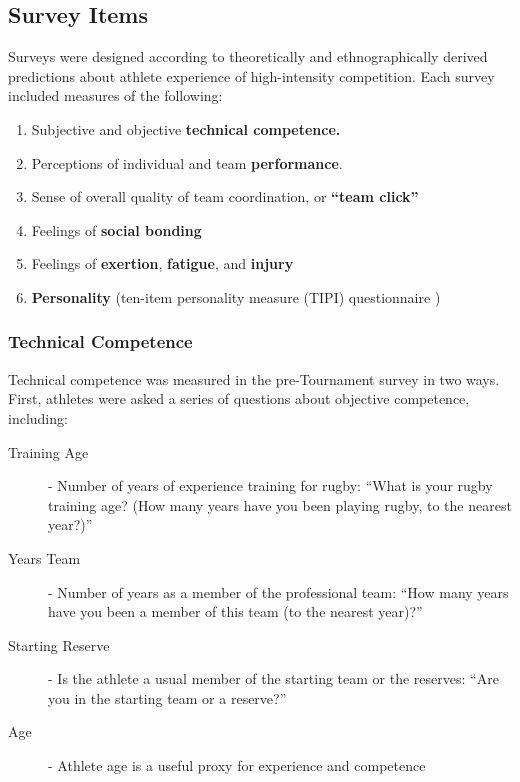 \subsection{Survey Items}

Surveys were designed according to theoretically and ethnographically derived predictions about athlete experience of high-intensity competition. Each survey included measures of the following:

\begin{enumerate}
\item Subjective and objective \textbf{technical competence.}
\item Perceptions of individual and team \textbf{performance}.
\item Sense of overall quality of team coordination, or \textbf{``team click''}
\item Feelings of \textbf{social bonding}
\item Feelings of \textbf{exertion}, \textbf{fatigue}, and \textbf{injury}
\item \textbf{Personality} (ten-item personality measure (TIPI) questionnaire  \citep{Gosling2003})
\end{enumerate}



    \subsubsection{Technical Competence}

Technical competence was measured in the pre-Tournament survey in two ways. First, athletes were asked a series of questions about objective competence, including:

\begin{description}
\item[Training Age] - Number of years of experience training for rugby:  ``What is your rugby training age? (How many years have you been playing rugby, to the nearest year?)''
\item[Years Team] - Number of years as a member of the professional team:  ``How many years have you been a member of this team (to the nearest year)?''
\item[Starting Reserve] - Is the athlete a usual member of the starting team or the reserves:  ``Are you in the starting team or a reserve?''
\item[Age] - Athlete age is a useful proxy for experience and competence
\end{description}
\bigskip


